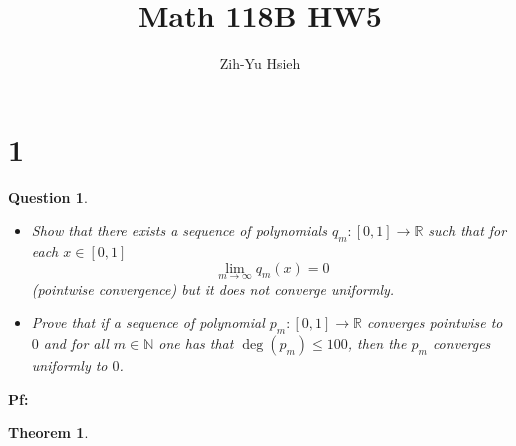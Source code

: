 \documentclass{article}
\title{Math 118B HW5}
\author{Zih-Yu Hsieh}
\newtheorem{theorem}{Theorem}
\newtheorem{question}{Question}
\begin{document}
\maketitle

\section*{1}
\begin{myBox}[]{}
    \begin{question}
        
        \hfill
        
        \begin{itemize}
            \item[(a)] Show that there exists a sequence of polynomials $q_m:[0,1]\rightarrow\mathbb{R}$ such that for each $x\in [0,1]$
            $$\lim_{m\rightarrow\infty}q_m(x)=0$$
            (pointwise convergence) but it does not converge uniformly.

            \item[(b)] Prove that if a sequence of polynomial $p_m:[0,1]\rightarrow\mathbb{R}$ converges pointwise to $0$ and for all $m\in\mathbb{N}$ one has that
            $\deg(p_m)\leq 100$, then the $p_m$ converges uniformly to $0$.
        \end{itemize}
    \end{question}
\end{myBox}

\textbf{Pf:}

\begin{theorem}

\end{theorem}
\end{document}
